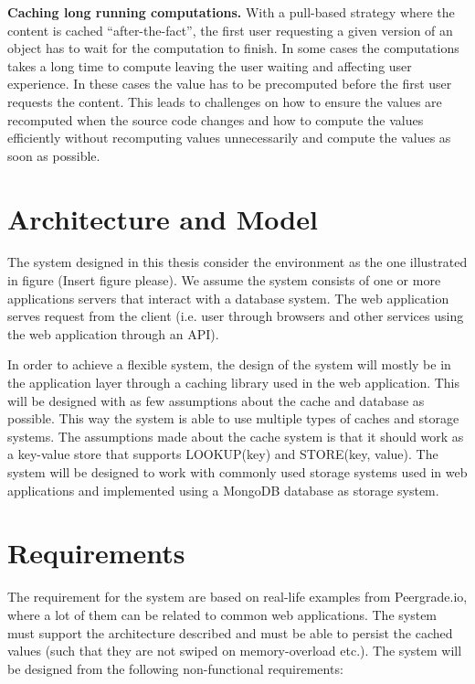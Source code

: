 \textbf{Caching long running computations.} With a pull-based strategy where the content is cached “after-the-fact”, the first user requesting a given version of an object has to wait for the computation to finish. In some cases the computations takes a long time to compute leaving the user waiting and affecting user experience. In these cases the value has to be precomputed before the first user requests the content. This leads to challenges on how to ensure the values are recomputed when the source code changes and how to compute the values efficiently without recomputing values unnecessarily and compute the values as soon as possible.

\section{Architecture and Model}

The system designed in this thesis consider the environment as the one illustrated in figure (Insert figure please). We assume the system consists of one or more applications servers that interact with a database system. The web application serves request from the client (i.e. user through browsers and other services using the web application through an API).

In order to achieve a flexible system, the design of the system will mostly be in the application layer through a caching library used in the web application. This will be designed with as few assumptions about the cache and database as possible. This way the system is able to use multiple types of caches and storage systems. The assumptions made about the cache system is that it should work as a key-value store that supports LOOKUP(key) and STORE(key, value). The system will be designed to work with commonly used storage systems used in web applications and implemented using a MongoDB database as storage system.

\section{Requirements}

The requirement for the system are based on real-life examples from Peergrade.io, where a lot of them can be related to common web applications. The system must support the architecture described and must be able to persist the cached values (such that they are not swiped on memory-overload etc.). The system will be designed from the following non-functional requirements:

